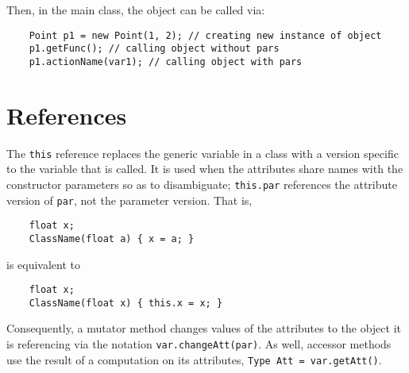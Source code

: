 \documentclass[letterpaper, openany, justified]{tufte-book}
\newcommand{\cd}[1]{\lstinline{#1}}
\begin{document}
\begin{fullwidth}
Then, in the main class, the object can be called via:
\begin{lstlisting}
    Point p1 = new Point(1, 2); // creating new instance of object
    p1.getFunc(); // calling object without pars
    p1.actionName(var1); // calling object with pars
\end{lstlisting}

\section{References}
The \cd{this} reference replaces the generic variable in a class with a version specific to the variable that is called. It is used when the attributes share names with the constructor parameters so as to disambiguate; \cd{this.par} references the attribute version of \cd{par}, not the parameter version. That is,
\begin{lstlisting}
    float x;
    ClassName(float a) { x = a; }
\end{lstlisting}
is equivalent to
\begin{lstlisting}
    float x;
    ClassName(float x) { this.x = x; }
\end{lstlisting}
Consequently, a mutator method changes values of the attributes to the object it is referencing via the notation \cd{var.changeAtt(par)}. As well, accessor methods use the result of a computation on its attributes, \cd{Type Att = var.getAtt()}.

\end{fullwidth}
\end{document}
